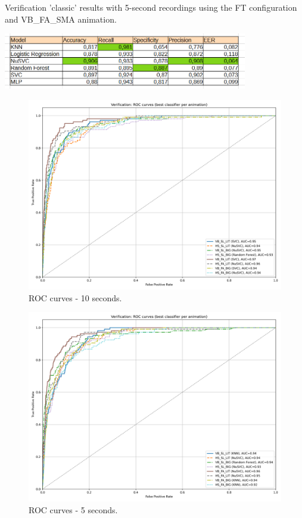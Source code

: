 \documentclass[12pt]{report}
\begin{document}
\begin{table}[ht]
    \centering
    \caption{Verification ’classic’ results with 5-second recordings using the FT configuration and VB\_FA\_SMA animation.}
    \includegraphics[width=0.8\textwidth]{Images/Results/Classic_procedure/five_ten/ft/five/VB_FA_LIT.png}
    \label{tab:VB_FA_LIT_cft_5}
\end{table}


\begin{figure}[ht]
    \centering
    \includegraphics[width = 0.6
    \textwidth]{Images/Results/Classic_procedure/five_ten/ft/ten/Verification_single_roc_ten_classic_ft.png}
    \caption{ROC curves - 10 seconds.}
    \label{fig:roc_cft_10}
\end{figure}

\begin{figure}[ht]
    \centering
    \includegraphics[width = 0.6
    \textwidth]{Images/Results/Classic_procedure/five_ten/ft/five/Verification_single_roc_five_classic_ft.png}
    \caption{ROC curves - 5 seconds.}
    \label{fig:roc_cft_5}
\end{figure}
\end{document}
